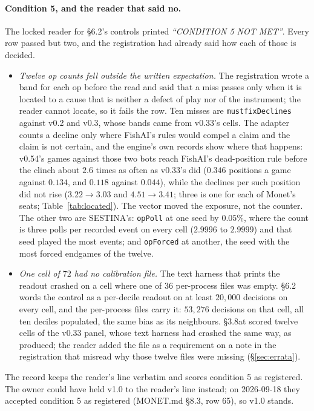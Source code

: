 \documentclass[11pt]{article}
\newcommand{\code}[1]{\texttt{#1}}
\newcommand{\monet}{MONET.md}
\newcommand{\sect}[1]{\S#1}
\begin{document}
\paragraph{Condition 5, and the reader that said no.} The locked reader for \sect{6.2}'s controls
printed \emph{``CONDITION 5 NOT MET''}. Every row passed but two, and the registration had already said
how each of those is decided.
\begin{itemize}[leftmargin=*]
  \item \emph{Twelve op counts fell outside the written expectation.} The registration wrote a band for
        each op before the read and said that a miss passes only when it is located to a cause that is
        neither a defect of play nor of the instrument; the reader cannot locate, so it fails the row.
        Ten misses are \code{mustfixDeclines} against v0.2 and v0.3, whose bands came from v0.33's cells.
        The adapter counts a decline only where FishAI's rules would compel a claim and the claim is not
        certain, and the engine's own records show where that happens: v0.54's games against those two
        bots reach FishAI's dead-position rule before the clinch about $2.6$ times as often as v0.33's did
        ($0.346$ positions a game against $0.134$, and $0.118$ against $0.044$), while the declines per
        such position did not rise ($3.22 \to 3.03$ and $4.51 \to 3.41$; three is one for each of
        Monet's seats; Table~\ref{tab:located}). The
        vector moved the exposure, not the counter. The other two are SESTINA's: \code{opPoll} at one seed
        by $0.05\%$, where the count is three polls per recorded event on every cell ($2.9996$ to $2.9999$)
        and that seed played the most events; and \code{opForced} at another, the seed with the most forced
        endgames of the twelve.
  \item \emph{One cell of $72$ had no calibration file.} The text harness that prints the readout
        crashed on a cell where one of $36$ per-process files was empty. \sect{6.2} words the control
        as a per-decile readout on at least $20{,}000$ decisions on every cell, and the per-process files
        carry it: $53{,}276$ decisions on that cell, all ten deciles populated, the same bias as its
        neighbours. \sect{3.8at} scored twelve cells of the v0.33 panel, whose text harness had crashed the same
        way, as produced; the reader added the file as a requirement on a note in the registration that
        misread why those twelve files were missing (\sect\ref{sec:errata}).
\end{itemize}
The record keeps the reader's line verbatim and scores condition 5 as registered. The owner could have
held v1.0 to the reader's line instead; on 2026-09-18 they accepted condition 5 as registered
(\monet{} \sect{8.3}, row 65), so v1.0 stands.
\end{document}
